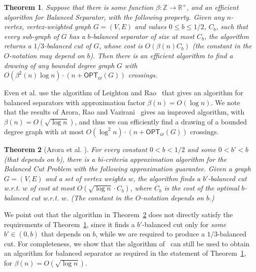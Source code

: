 \documentclass[twoside,leqno,twocolumn]{article}
\newtheorem{theorem}{Theorem}
\newcommand{\optcro}[1]{\mathsf{OPT}_{\mathsf{cr}}(#1)}
\begin{document}
\begin{theorem}\label{lem:ARV-corollary}
Suppose that there is some function $\beta:{\mathbb Z}\rightarrow {\mathbb R}^+$, and an efficient algorithm for Balanced Separator, with the following property. Given any $n$-vertex, vertex-weighted graph $G = (V,E)$ and values $0\leq b\leq 1/2$, $C_b$, such that every sub-graph of $G$ has a $b$-balanced separator of size at most $C_b$, the algorithm returns a $1/3$-balanced cut of $G$, whose cost is $O(\beta(n) C_b)$ (the constant in the $O$-notation may depend on $b$).   Then there is an efficient algorithm to find a drawing of any bounded degree graph $G$ with $O(\beta^2(n) \log n) \cdot (n+\optcro{G})$ crossings.
\end{theorem}
Even et al. use the algorithm of Leighton and Rao~\cite{LR} that gives an algorithm for balanced separators with approximation factor $\beta(n) = O(\log n)$. We note that the results of Arora, Rao and Vazirani~\cite{ARV} gives an improved algorithm, with $\beta(n) = O(\sqrt{\log n})$, and thus we can efficiently find a drawing of a bounded degree graph with at most $O(\log^2 n) \cdot (n+\optcro{G})$ crossings. 
\begin{theorem}[Arora et al. \cite{ARV}]\label{thm:ARV-alg}
For every constant $0<b<1/2$ and some $0 < b' < b$ (that depends on $b$), there is a bi-criteria approximation algorithm for the Balanced Cut Problem with the following approximation guarantee. Given a graph $G=(V,E)$ and a set of vertex weights $w$, the algorithm finds a $b'$-balanced cut w.r.t. $w$ of cost at most $O(\sqrt{\log n} \cdot C_b)$, where $C_b$ is the cost of the optimal $b$-balanced cut w.r.t. $w$. (The constant in the $O$-notation depends on $b$.)
\end{theorem}
We point out that the algorithm in Theorem~\ref{thm:ARV-alg} does not directly satisfy the requirements of Theorem~\ref{lem:ARV-corollary}, since it finds a $b'$-balanced cut only for \textit{some} $b'\in (0,b)$ that depends on $b$, while we are required to produce a $1/3$-balanced cut.
For completeness, we show that the algorithm of~\cite{ARV} can still be used to obtain an algorithm for balanced separator as required in the statement of Theorem~\ref{lem:ARV-corollary}, for $\beta(n)=O(\sqrt{\log n})$.
\end{document}
